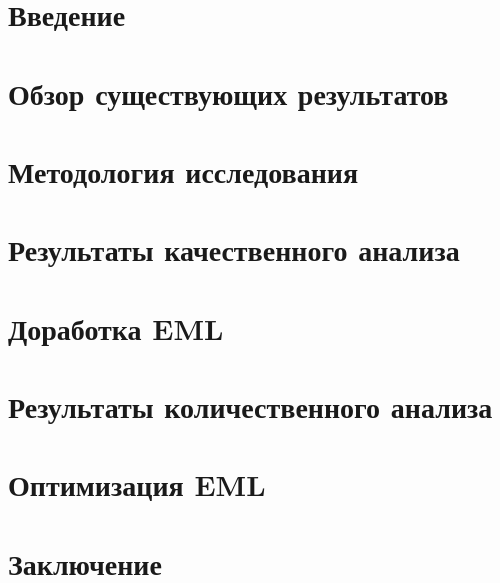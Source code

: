 



% 

% 

\newpage
\tableofcontents

\setcounter{page}{2}

\section*{Введение}


\newpage
\section{Обзор существующих результатов}


\newpage
\section{Методология исследования}


\section{Результаты качественного анализа}


\newpage
\section{Доработка EML}


\newpage
\section{Результаты количественного анализа}


\newpage
\section{Оптимизация EML}


\newpage
\section*{Заключение}


